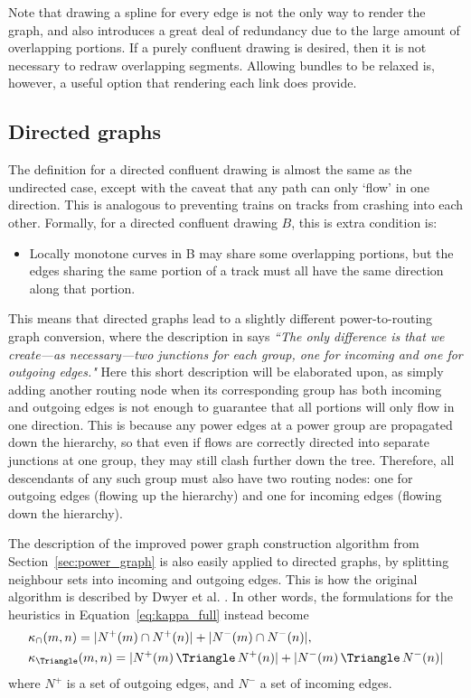 Note that drawing a spline for every edge is not the only way to render the graph, and also introduces a great deal of redundancy due to the large amount of overlapping portions. If a purely confluent drawing is desired, then it is not necessary to redraw overlapping segments.
Allowing bundles to be relaxed \cite[Fig.~18]{Bach2017} is, however, a useful option that rendering each link does provide.

\subsection{Directed graphs}
\label{sec:power_directed}
The definition for a directed confluent drawing is almost the same as the undirected case, except with the caveat that any path can only `flow' in one direction. This is analogous to preventing trains on tracks from crashing into each other. 
Formally, for a directed confluent drawing $B$, this is extra condition \cite{Dickerson2005} is:
\begin{mdframed}[backgroundcolor=WhiteSmoke]
\begin{itemize}[leftmargin=*]
  \item Locally monotone curves in B may share some overlapping portions, but the edges sharing the same portion of a track must all have the same direction along that portion.
\end{itemize}
\end{mdframed}
This means that directed graphs lead to a slightly different power-to-routing graph conversion, where the description in \cite{Bach2017} says \emph{``The only difference is that we create---as necessary---two junctions for each group, one for incoming and one for outgoing edges."}
Here this short description will be elaborated upon, as simply adding another routing node when its corresponding group has both incoming and outgoing edges is not enough to guarantee that all portions will only flow in one direction.
This is because any power edges at a power group are propagated down the hierarchy, so that even if flows are correctly directed into separate junctions at one group, they may still clash further down the tree.
Therefore, all descendants of any such group must also have two routing nodes: one for outgoing edges (flowing up the hierarchy) and one for incoming edges (flowing down the hierarchy).

The description of the improved power graph construction algorithm from Section~\ref{sec:power_graph} is also easily applied to directed graphs, by splitting neighbour sets into incoming and outgoing edges. This is how the original algorithm is described by Dwyer et al. \cite{Dwyer2014}.
In other words, the formulations for the heuristics in Equation~\eqref{eq:kappa_full} instead become
\begin{align}
  &\kappa_\cap(m,n) = |N^+(m)\cap N^+(n)| + |N^-(m)\cap N^-(n)|,\\
  &\kappa_{\Triangle}(m,n) = |N^+(m)\,\Triangle\,N^+(n)| + |N^-(m)\,\Triangle\,N^-(n)|
\end{align}
where $N^+$ is a set of outgoing edges, and $N^-$ a set of incoming edges.

